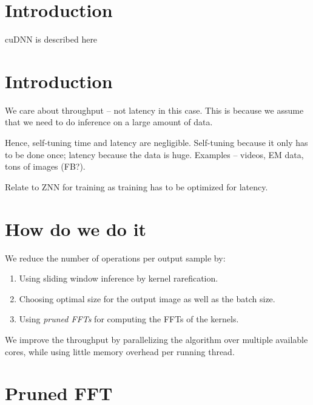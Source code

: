 \documentclass[conference]{IEEEtran}
\begin{document}
\section{Introduction}

cuDNN is described here~\cite{chetlur2014cudnn}

\section{Introduction}

We care about throughput -- not latency in this case.  This is because
we assume that we need to do inference on a large amount of data.

Hence, self-tuning time and latency are negligible.  Self-tuning
because it only has to be done once; latency because the data is huge.
Examples -- videos, EM data, tons of images (FB?).

Relate to ZNN for training as training has to be optimized for
latency.

\section{How do we do it}


We reduce the number of operations per output sample by:
\begin{enumerate}
\item Using sliding window inference by kernel rarefication.
\item Choosing optimal size for the output image as well as the batch
  size.
\item Using \emph{pruned FFTs} for computing the FFTs of the kernels.
\end{enumerate}

We improve the throughput by parallelizing the algorithm over multiple
available cores, while using little memory overhead per running
thread.


\section{Pruned FFT}
\end{document}
